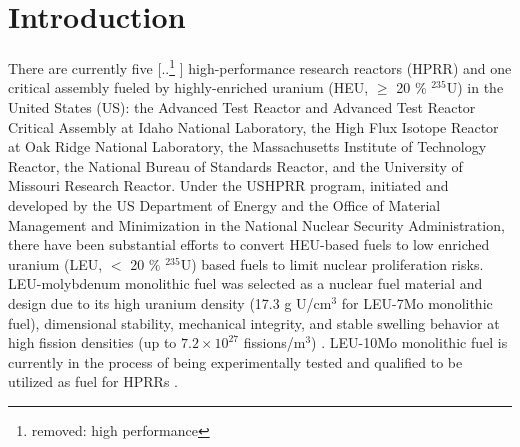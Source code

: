 \documentclass[preprint,12pt]{elsarticle}
\providecommand{\DIFadd}[1]{{\protect\color{blue} \sf #1}} %
\providecommand{\DIFdel}[1]{{\protect\color{red} [..\footnote{removed: #1} ]}} %
\providecommand{\DIFaddbegin}{} %
\providecommand{\DIFaddend}{} %
\providecommand{\DIFdelbegin}{} %
\providecommand{\DIFdelend}{} %
\newcommand{\DIFscaledelfig}{0.5}
\newlength{\DIFdelgraphicswidth} %
\newlength{\DIFdelgraphicsheight} %
\newcommand{\DIFaddincludegraphics}[2][]{{\color{blue}\fbox{\DIFOincludegraphics[#1]{#2}}}} %
\newcommand{\DIFdelincludegraphics}[2][]{%
\sbox{\DIFdelgraphicsbox}{\DIFOincludegraphics[#1]{#2}}%
\settoboxwidth{\DIFdelgraphicswidth}{\DIFdelgraphicsbox} %
\settoboxtotalheight{\DIFdelgraphicsheight}{\DIFdelgraphicsbox} %
\scalebox{\DIFscaledelfig}{%
\parbox[b]{\DIFdelgraphicswidth}{\usebox{\DIFdelgraphicsbox}\\[-\baselineskip] \rule{\DIFdelgraphicswidth}{0em}}\llap{\resizebox{\DIFdelgraphicswidth}{\DIFdelgraphicsheight}{%
\setlength{\unitlength}{\DIFdelgraphicswidth}%
\begin{picture}(1,1)%
\thicklines\linethickness{2pt} %
{\color[rgb]{1,0,0}\put(0,0){\framebox(1,1){}}}%
{\color[rgb]{1,0,0}\put(0,0){\line( 1,1){1}}}%
{\color[rgb]{1,0,0}\put(0,1){\line(1,-1){1}}}%
\end{picture}%
}\hspace*{3pt}}} %
} %
\DeclareRobustCommand{\DIFaddbegin}{\DIFOaddbegin \let\includegraphics\DIFaddincludegraphics} %
\DeclareRobustCommand{\DIFaddend}{\DIFOaddend \let\includegraphics\DIFOincludegraphics} %
\DeclareRobustCommand{\DIFdelbegin}{\DIFOdelbegin \let\includegraphics\DIFdelincludegraphics} %
\DeclareRobustCommand{\DIFdelend}{\DIFOaddend \let\includegraphics\DIFOincludegraphics} %
\begin{document}
\section{Introduction}
There are currently five \DIFdelbegin \DIFdel{high performance }\DIFdelend \DIFaddbegin \DIFadd{high-performance }\DIFaddend research reactors (HPRR) and one critical assembly fueled by highly-enriched uranium (HEU, $\geq$ 20 $\%$ $^{235}$U) in the United States (US): the Advanced Test Reactor and Advanced Test Reactor Critical Assembly at Idaho National Laboratory, the High Flux Isotope Reactor at Oak Ridge National Laboratory, the Massachusetts Institute of Technology Reactor, the National Bureau of Standards Reactor, and the University of Missouri Research Reactor. Under the USHPRR program, initiated and developed by the US Department of Energy and the Office of Material Management and Minimization in the National Nuclear Security Administration, there have been substantial efforts to convert HEU-based fuels to low enriched uranium (LEU, $<$ 20 $\%$ $^{235}$U) based fuels to limit nuclear proliferation risks. LEU-molybdenum monolithic fuel was selected as a nuclear fuel material and design due to its high uranium density (17.3 g U/cm$^{3}$ for LEU-7Mo monolithic fuel), dimensional stability, mechanical integrity, and stable swelling behavior at high fission densities (up to $7.2\times10^{27}$ fissions/m$^{3}$) \cite{kim2011fission, robinson2013irradiation, meyer2014irradiation, keiser2017observed, prabhakaran2017u, jue2018effects}. 
LEU-10Mo monolithic fuel is currently in the process of being experimentally tested and qualified to be utilized as fuel for HPRRs \cite{miller2021u, gan2017irradiated, giglio2021ushprr}.\\
\end{document}
